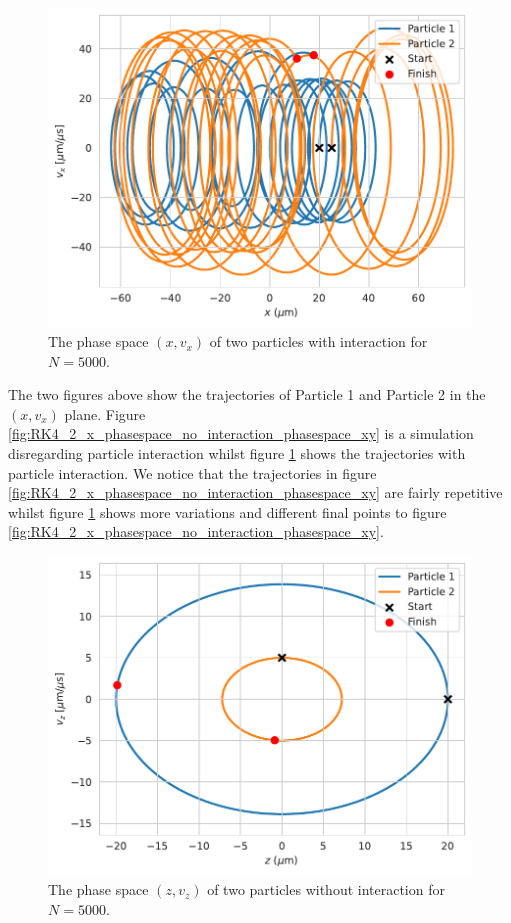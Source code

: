 \documentclass[english,notitlepage,reprint,nofootinbib]{revtex4-1}  %
\begin{document}
\begin{figure}[H]
    \centering
    \includegraphics[width=.5\textwidth]{../figures/phase_space_x_interaction_RK4_N5000.pdf}
    \caption{The phase space $(x, v_x)$ of two particles with interaction for $N = 5000$.}
    \label{fig:RK4_2_x_phasespace_with_interaction_phasespace_xy}
\end{figure}
The two figures above show the trajectories of Particle 1 and Particle 2 in the $(x,v_x)$ plane.
Figure \ref{fig:RK4_2_x_phasespace_no_interaction_phasespace_xy} is a simulation disregarding particle interaction whilst
figure \ref{fig:RK4_2_x_phasespace_with_interaction_phasespace_xy} shows the trajectories with particle interaction. We
notice that the trajectories in figure \ref{fig:RK4_2_x_phasespace_no_interaction_phasespace_xy} are fairly repetitive whilst
figure \ref{fig:RK4_2_x_phasespace_with_interaction_phasespace_xy} shows more variations and different final points to figure
\ref{fig:RK4_2_x_phasespace_no_interaction_phasespace_xy}.

\begin{figure}[H]
    \centering
    \includegraphics[width=.5\textwidth]{../figures/phase_space_z_RK4_N5000.pdf}
    \caption{The phase space $(z, v_z)$ of two particles without interaction for $N = 5000$.}
    \label{fig:K4_2_z_phasespace_no_interaction_phasespace_xy}
\end{figure}
\end{document}
